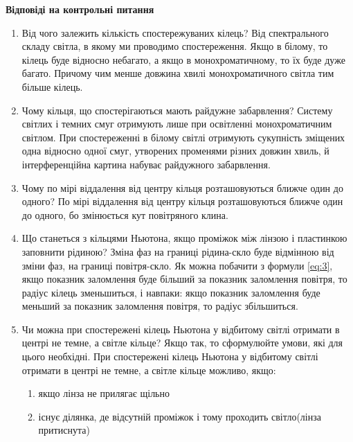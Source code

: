 \begin{center}
    \Large{\textbf{Відповіді на контрольні питання}}    
\end{center}

\vspace{1mm}

\begin{enumerate}
    \item Від чого залежить кількість спостережуваних кілець?
    \bigbreak
    Від спектрального складу світла, в якому ми проводимо спостереження.
    Якщо в білому, то кілець буде відносно небагато, а якщо в монохроматичному, то їх буде дуже багато.
    Причому чим менше довжина хвилі монохроматичного світла тим більше кілець.
    
    \item Чому кільця, що спостерігаються мають райдужне забарвлення?
    \bigbreak
    Систему світлих і темних смуг отримують лише при освітленні монохроматичним світлом. При
    спостереженні в білому світлі отримують сукупність зміщених одна відносно одної смуг,
    утворених променями різних довжин хвиль, й інтерференційна картина набуває райдужного
    забарвлення.
    
    \item Чому по мірі віддалення від центру кільця розташовуються ближче один
    до одного?
    \bigbreak
    По мірі віддалення від центру кільця розташовуються ближче один
    до одного, бо змінюється кут повітряного клина.

    \item Що станеться з кільцями Ньютона, якщо проміжок між лінзою і пластинкою заповнити рідиною?
    \bigbreak
    Зміна фаз на границі рідина-скло буде відмінною від зміни фаз,
    на границі повітря-скло. Як можна побачити з формули \ref{eq:3}, якщо
    показник заломлення буде більший за показник заломлення повітря,
    то радіус кілець зменьшиться, і навпаки: якщо
    показник заломлення буде меньший за показник заломлення повітря, то радіус
    збільшиться.

    \item Чи можна при спостережені кілець Ньютона у відбитому світлі отримати в центрі не темне,
    а світле кільце? Якщо так, то сформулюйте умови, які для цього необхідні.
    \bigbreak
    При спостережені кілець Ньютона у відбитому світлі отримати в центрі не темне,
    а світле кільце можливо, якщо:
    \begin{enumerate}
        \item якщо лінза не прилягає щільно 
        \item існує ділянка, де відсутній проміжок і тому проходить світло(лінза притиснута)
    \end{enumerate}

\end{enumerate}